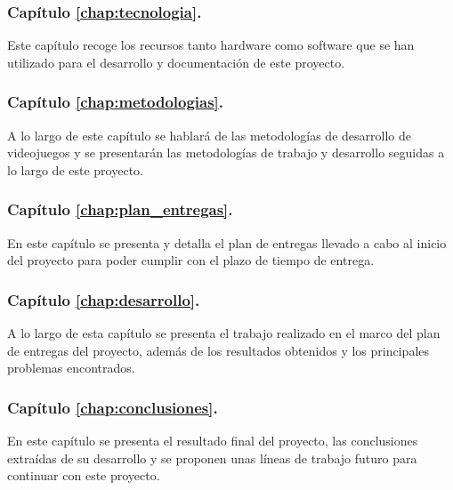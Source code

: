 \subsubsection{Capítulo \ref{chap:tecnologia}. }

Este capítulo recoge los recursos tanto hardware como software que se han utilizado para el desarrollo y documentación de este proyecto.

\subsubsection{Capítulo \ref{chap:metodologias}. }

A lo largo de este capítulo se hablará de las metodologías de desarrollo de videojuegos y se presentarán las metodologías de trabajo y desarrollo seguidas a lo largo de este proyecto.

\subsubsection{Capítulo \ref{chap:plan_entregas}. }

En este capítulo se presenta y detalla el plan de entregas llevado a cabo al inicio del proyecto para poder cumplir con el plazo de tiempo de entrega.

\subsubsection{Capítulo \ref{chap:desarrollo}. }

A lo largo de esta capítulo se presenta el trabajo realizado en el marco del plan de entregas del proyecto, además de los resultados obtenidos y los principales problemas encontrados.

\subsubsection{Capítulo \ref{chap:conclusiones}. }

En este capítulo se presenta el resultado final del proyecto, las conclusiones extraídas de su desarrollo y se proponen unas líneas de trabajo futuro para continuar con este proyecto.